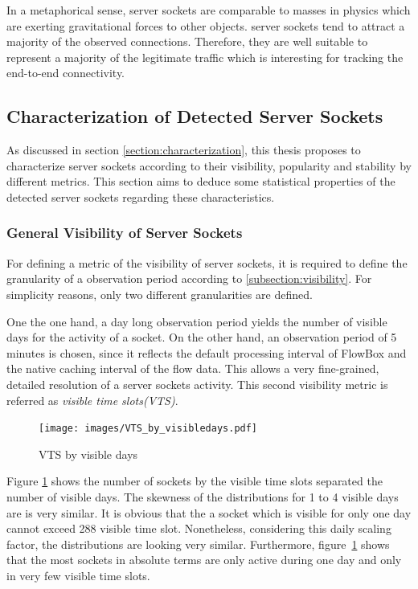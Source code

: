 In a metaphorical sense, \glspl{server socket} are comparable to masses in physics which are exerting gravitational forces to other objects. 
\Glspl{server socket} tend to attract a majority of the observed connections. 
Therefore, they are well suitable to represent a majority of the legitimate traffic which is interesting for tracking the end-to-end connectivity.

\newpage
\subsection{Characterization of Detected Server Sockets}

As discussed in section \ref{section:characterization}, this thesis proposes to characterize \glspl{server socket} according to their visibility, popularity and stability by different metrics. This section aims to deduce some statistical properties of the detected \glspl{server socket} regarding these characteristics.

\subsubsection{General Visibility of Server Sockets}

For defining a metric of the visibility of \glspl{server socket}, it is required to define the granularity of a observation period according to \ref{subsection:visibility}. For simplicity reasons, only two different granularities are defined.

One the one hand, a day long observation period yields the number of visible days for the activity of a socket. 
On the other hand, an observation period of 5 minutes is chosen, since it reflects the default processing interval of FlowBox and the native caching interval of the flow data.
This allows a very fine-grained, detailed resolution of a \glspl{server socket} activity. 
This second visibility metric is referred as \emph{visible time slots(VTS)}.

\begin{figure}
	[hb] \centering
	\texttt{[image: images/VTS\_by\_visibledays.pdf]}
	\caption{VTS by visible days}
	\label{fig:vts_by_visibledays}
\end{figure}

Figure \ref{fig:vts_by_visibledays} shows the number of sockets by the visible time slots separated the number of visible days. 
The skewness of the distributions for 1 to 4 visible days are is very similar. 
It is obvious that the a socket which is visible for only one day cannot exceed 288 visible time slot. 
Nonetheless, considering this daily scaling factor, the distributions are looking very similar. 
Furthermore, figure \ref{fig:vts_by_visibledays} shows that the most sockets in absolute terms are only active during one day and only in very few visible time slots.

